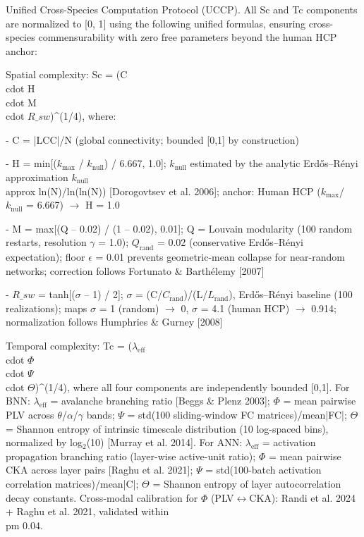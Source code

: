 \documentclass[a4paper,12pt]{article}
\begin{document}
Unified Cross-Species Computation Protocol (UCCP). All Sc and Tc components are normalized to [0, 1] using the following unified formulas, ensuring cross-species commensurability with zero free parameters beyond the human HCP anchor:


Spatial complexity: Sc = (C  \\cdot  H  \\cdot  M  \\cdot  $R\_{sw}$)^(1/4), where:


- C = |LCC|/N (global connectivity; bounded [0,1] by construction)


- H = min[($k_{\text{max}}$ / $k_{\text{null}}$) / 6.667, 1.0]; $k_{\text{null}}$ estimated by the analytic Erd\H{o}s--R\'{e}nyi approximation $k_{\text{null}}$  \\approx  ln(N)/ln(ln(N)) [Dorogovtsev et al. 2006]; anchor: Human HCP ($k_{\text{max}}$/$k_{\text{null}}$ = 6.667) $\rightarrow$ H = 1.0


- M = max[(Q -- 0.02) / (1 -- 0.02), 0.01]; Q = Louvain modularity (100 random restarts, resolution $\gamma$ = 1.0); $Q_{\text{rand}}$ = 0.02 (conservative Erd\H{o}s--R\'{e}nyi expectation); floor $\epsilon$ = 0.01 prevents geometric-mean collapse for near-random networks; correction follows Fortunato \& Barth\'{e}lemy [2007]


- $R\_{sw}$ = tanh[($\sigma$ -- 1) / 2]; $\sigma$ = (C/$C_{\text{rand}}$)/(L/$L_{\text{rand}}$), Erd\H{o}s--R\'{e}nyi baseline (100 realizations); maps $\sigma$ = 1 (random) $\rightarrow$ 0, $\sigma$ = 4.1 (human HCP) $\rightarrow$ 0.914; normalization follows Humphries \& Gurney [2008]


Temporal complexity: Tc = ($\lambda_{\text{eff}}$  \\cdot  $\Phi$  \\cdot  $\Psi$  \\cdot  $\Theta$)^(1/4), where all four components are independently bounded [0,1]. For BNN: $\lambda_{\text{eff}}$ = avalanche branching ratio [Beggs \& Plenz 2003]; $\Phi$ = mean pairwise PLV across $\theta$/$\alpha$/$\gamma$ bands; $\Psi$ = std(100 sliding-window FC matrices)/mean|FC|; $\Theta$ = Shannon entropy of intrinsic timescale distribution (10 log-spaced bins), normalized by log$_2$(10) [Murray et al. 2014]. For ANN: $\lambda_{\text{eff}}$ = activation propagation branching ratio (layer-wise active-unit ratio); $\Phi$ = mean pairwise CKA across layer pairs [Raghu et al. 2021]; $\Psi$ = std(100-batch activation correlation matrices)/mean|C|; $\Theta$ = Shannon entropy of layer autocorrelation decay constants. Cross-modal calibration for $\Phi$ (PLV$\leftrightarrow$CKA): Randi et al. 2024 + Raghu et al. 2021, validated within  \\pm 0.04.
\end{document}
